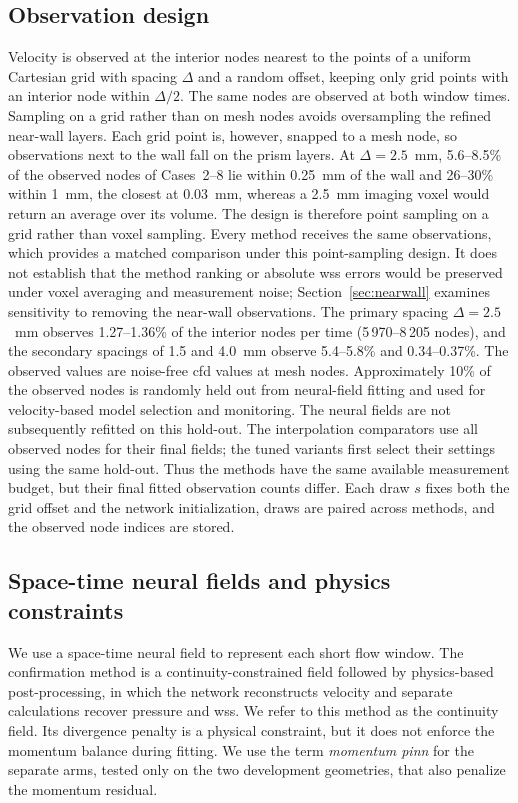 \documentclass[12pt,a4paper]{article}
\newcommand{\CFD}{\ac{cfd}\xspace}
\newcommand{\PINN}{\ac{pinn}\xspace}
\newcommand{\WSS}{\ac{wss}\xspace}
\theoremstyle{definition}
\numberwithin{equation}{section}
\begin{document}
\subsection{Observation design}
\label{sec:observations}
Velocity is observed at the interior nodes nearest to the points of a uniform Cartesian grid with spacing $\Delta$ and a random offset, keeping only grid points with an interior node within $\Delta/2$. The same nodes are observed at both window times. Sampling on a grid rather than on mesh nodes avoids oversampling the refined near-wall layers. Each grid point is, however, snapped to a mesh node, so observations next to the wall fall on the prism layers. At $\Delta=2.5$~mm, 5.6--8.5\% of the observed nodes of Cases~2--8 lie within 0.25~mm of the wall and 26--30\% within 1~mm, the closest at 0.03~mm, whereas a 2.5~mm imaging voxel would return an average over its volume. The design is therefore point sampling on a grid rather than voxel sampling. Every method receives the same observations, which provides a matched comparison under this point-sampling design. It does not establish that the method ranking or absolute \WSS errors would be preserved under voxel averaging and measurement noise; Section~\ref{sec:nearwall} examines sensitivity to removing the near-wall observations. The primary spacing $\Delta=2.5$~mm observes 1.27--1.36\% of the interior nodes per time (5\,970--8\,205 nodes), and the secondary spacings of 1.5 and 4.0~mm observe 5.4--5.8\% and 0.34--0.37\%. The observed values are noise-free \CFD values at mesh nodes. Approximately 10\% of the observed nodes is randomly held out from neural-field fitting and used for velocity-based model selection and monitoring. The neural fields are not subsequently refitted on this hold-out. The interpolation comparators use all observed nodes for their final fields; the tuned variants first select their settings using the same hold-out. Thus the methods have the same available measurement budget, but their final fitted observation counts differ. Each draw $s$ fixes both the grid offset and the network initialization, draws are paired across methods, and the observed node indices are stored.


\subsection{Space-time neural fields and physics constraints}
\label{sec:field}
We use a space-time neural field to represent each short flow window. The confirmation method is a continuity-constrained field followed by physics-based post-processing, in which the network reconstructs velocity and separate calculations recover pressure and \WSS. We refer to this method as the continuity field. Its divergence penalty is a physical constraint, but it does not enforce the momentum balance during fitting. We use the term \emph{momentum \PINN} for the separate arms, tested only on the two development geometries, that also penalize the momentum residual. 
\end{document}

